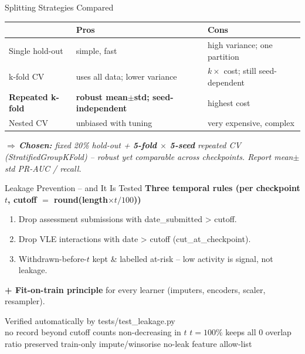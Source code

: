 \documentclass[aspectratio=169,10pt]{beamer}
\newcommand{\hc}[1]{{\bfseries\color{white}#1}}
\newcommand{\tcode}[1]{{\ttfamily #1}}
\newcommand{\takeaway}[1]{\vspace{2pt}\par{\footnotesize\itshape\textcolor{themecol}{$\Rightarrow$\,}#1}}
\begin{document}
\begin{frame}{Splitting Strategies Compared}
  {\scriptsize
  \setlength{\tabcolsep}{5pt}\renewcommand{\arraystretch}{1.3}
  \begin{tabularx}{\textwidth}{@{}>{\raggedright\arraybackslash}p{2.4cm} Y Y@{}}
    \toprule
    \rowcolor{themecol}\hc{Strategy} & \hc{Pros} & \hc{Cons}\\
    \midrule
    Single hold-out & simple, fast & high variance; one partition\\
    k-fold CV & uses all data; lower variance & $k\times$ cost; still seed-dependent\\
    \textbf{Repeated k-fold} & \textbf{robust mean$\pm$std; seed-independent} & highest cost\\
    Nested CV & unbiased with tuning & very expensive, complex\\
    \bottomrule
  \end{tabularx}}
  \takeaway{\textbf{Chosen:} fixed 20\% hold-out + \textbf{5-fold $\times$ 5-seed} repeated CV (\tcode{StratifiedGroupKFold}) -- robust yet comparable across checkpoints. Report mean$\pm$std PR-AUC / recall.}
\end{frame}

\begin{frame}{Leakage Prevention -- and It Is Tested}
  \footnotesize\textbf{Three temporal rules (per checkpoint $t$, cutoff $=$ \tcode{round(length$\times t/100$)})}
  \begin{enumerate}\setlength\itemsep{0.25em}
    \item Drop assessment submissions with \tcode{date\_submitted > cutoff}.
    \item Drop VLE interactions with \tcode{date > cutoff} (\tcode{cut\_at\_checkpoint}).
    \item Withdrawn-before-$t$ kept \& labelled at-risk -- low activity is signal, not leakage.
  \end{enumerate}
  \textbf{+ Fit-on-train principle} for every learner (imputers, encoders, scaler, resampler).
  \vspace{4pt}
  \begin{exampleblock}{Verified automatically by \tcode{tests/test\_leakage.py}}
    \\[2pt]
    {\scriptsize no record beyond cutoff \textbullet{} counts non-decreasing in $t$ \textbullet{} $t{=}100\%$ keeps all \textbullet{} 0 overlap \textbullet{} ratio preserved \textbullet{} train-only impute/winsorise \textbullet{} no-leak feature allow-list}
  \end{exampleblock}
\end{frame}
\end{document}

